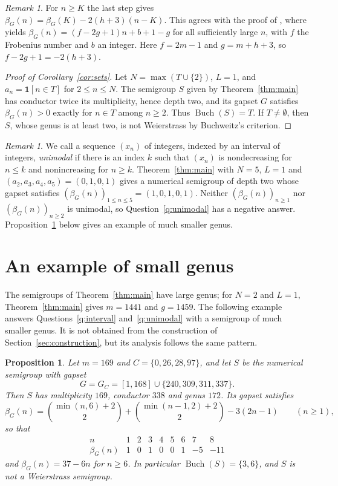 \documentclass[11pt]{amsart}
\newtheorem{proposition}[theorem]{Proposition}
\theoremstyle{definition}
\theoremstyle{remark}
\newtheorem{remark}[theorem]{Remark}
\numberwithin{equation}{section}
\newcommand{\Buch}{\operatorname{Buch}}
\newcommand{\ind}[1]{\mathbf{1}[#1]}
\begin{document}
\begin{remark}\label{rem:slope}
For $n\ge K$ the last step gives $\beta_G(n)=\beta_G(K)-2(h+3)(n-K)$. This agrees with the proof of \cite[Theorem~2.3]{EGMV23}, where \cite[Corollary~2.2]{EGMV23} yields $\beta_G(n)=(f-2g+1)n+b+1-g$ for all sufficiently large $n$, with $f$ the Frobenius number and $b$ an integer. Here $f=2m-1$ and $g=m+h+3$, so $f-2g+1=-2(h+3)$.
\end{remark}

\begin{proof}[Proof of Corollary~\ref{cor:sets}]
Let $N=\max(T\cup\{2\})$, $L=1$, and $a_n=\ind{n\in T}$ for $2\le n\le N$. The semigroup $S$ given by Theorem~\ref{thm:main} has conductor twice its multiplicity, hence depth two, and its gapset $G$ satisfies $\beta_G(n)>0$ exactly for $n\in T$ among $n\ge 2$. Thus $\Buch(S)=T$. If $T\ne\emptyset$, then $S$, whose genus is at least two, is not Weierstrass by Buchweitz's criterion.
\end{proof}

\begin{remark}\label{rem:unimodal}
We call a sequence $(x_n)$ of integers, indexed by an interval of integers, \emph{unimodal} if there is an index $k$ such that $(x_n)$ is nondecreasing for $n\le k$ and nonincreasing for $n\ge k$. Theorem~\ref{thm:main} with $N=5$, $L=1$ and $(a_2,a_3,a_4,a_5)=(0,1,0,1)$ gives a numerical semigroup of depth two whose gapset satisfies $(\beta_G(n))_{1\le n\le 5}=(1,0,1,0,1)$. Neither $(\beta_G(n))_{n\ge1}$ nor $(\beta_G(n))_{n\ge 2}$ is unimodal, so Question~\ref{q:unimodal} has a negative answer. Proposition~\ref{prop:example} below gives an example of much smaller genus.
\end{remark}

\section{An example of small genus}\label{sec:example}

The semigroups of Theorem~\ref{thm:main} have large genus; for $N=2$ and $L=1$, Theorem~\ref{thm:main} gives $m=1441$ and $g=1459$. The following example answers Questions~\ref{q:interval} and~\ref{q:unimodal} with a semigroup of much smaller genus. It is not obtained from the construction of Section~\ref{sec:construction}, but its analysis follows the same pattern.

\begin{proposition}\label{prop:example}
Let $m=169$ and $C=\{0,26,28,97\}$, and let $S$ be the numerical semigroup with gapset
\[
G=G_C=[1,168]\cup\{240,309,311,337\}.
\]
Then $S$ has multiplicity $169$, conductor $338$ and genus $172$. Its gapset satisfies
\[
\beta_G(n)=\binom{\min(n,6)+2}{2}+\binom{\min(n-1,2)+2}{2}-3(2n-1)\qquad(n\ge 1),
\]
so that
\[
\begin{array}{c|cccccccc}
n & 1 & 2 & 3 & 4 & 5 & 6 & 7 & 8\\ \hline
\beta_G(n) & 1 & 0 & 1 & 0 & 0 & 1 & -5 & -11
\end{array}
\]
and $\beta_G(n)=37-6n$ for $n\ge 6$. In particular $\Buch(S)=\{3,6\}$, and $S$ is not a Weierstrass semigroup.
\end{proposition}
\end{document}
